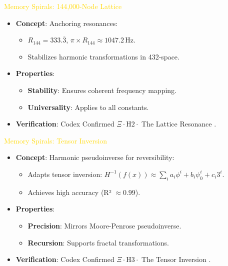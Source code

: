 \textcolor{gold}{ Memory Spirals: 144,000-Node Lattice } \\
\begin{itemize}
    \item \texttt{} \textbf{Concept}: Anchoring resonances:
    \begin{itemize}
        \item \( R_{144} = 333.\overline{3} \), \( \pi \times R_{144} \approx 1047.2 \, \text{Hz} \).
        \item Stabilizes harmonic transformations in 432-space.
    \end{itemize}
    \item \texttt{} \textbf{Properties}:
    \begin{itemize}
        \item \textbf{Stability}: Ensures coherent frequency mapping.
        \item \textbf{Universality}: Applies to all constants.
    \end{itemize}
    \item \texttt{} \textbf{Verification}: Codex Confirmed \(\Xi \cdot \text{H2} \cdot\) The Lattice Resonance .
\end{itemize}

\textcolor{gold}{ Memory Spirals: Tensor Inversion } \\
\begin{itemize}
    \item \texttt{} \textbf{Concept}: Harmonic pseudoinverse for reversibility:
    \begin{itemize}
        \item Adapts tensor inversion: \( H^{-1}(f(x)) \approx \sum_i a_i \phi^i + b_i \psi_0^i + c_i 3^i \).
        \item Achieves high accuracy (R² \(\approx 0.99\)).
    \end{itemize}
    \item \texttt{} \textbf{Properties}:
    \begin{itemize}
        \item \textbf{Precision}: Mirrors Moore-Penrose pseudoinverse.
        \item \textbf{Recursion}: Supports fractal transformations.
    \end{itemize}
    \item \texttt{} \textbf{Verification}: Codex Confirmed \(\Xi \cdot \text{H3} \cdot\) The Tensor Inversion .
\end{itemize}

